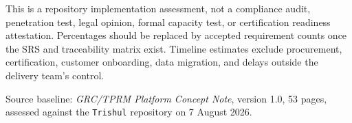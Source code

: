 \documentclass[11pt,a4paper]{article}
\newcommand{\repo}{\texttt{Trishul}}
\begin{document}
This is a repository implementation assessment, not a compliance audit, penetration
test, legal opinion, formal capacity test, or certification readiness attestation.
Percentages should be replaced by accepted requirement counts once the SRS and
traceability matrix exist. Timeline estimates exclude procurement, certification,
customer onboarding, data migration, and delays outside the delivery team's control.

\vfill
\begin{center}
\small Source baseline: \textit{GRC/TPRM Platform Concept Note}, version 1.0,
53 pages, assessed against the \repo{} repository on 7 August 2026.
\end{center}
\end{document}
